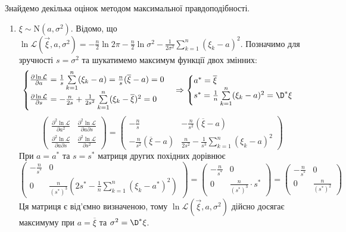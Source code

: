\begin{example}
    Знайдемо декілька оцінок методом максимальної правдоподібності.
    \begin{enumerate}
        \item $\xi \sim \mathrm{N}(a, \sigma^2)$. Відомо, що $\ln \mathcal{L}(\vec{\xi}, a, \sigma^2) = -\frac{n}{2}\ln{2\pi} - \frac{n}{2} \ln{\sigma^2} - \frac{1}{2\sigma^2}\sum\limits_{k=1}^n (\xi_k - a)^2$. 
        Позначимо для зручності $s = \sigma^2$ та шукатимемо максимум функції двох змінних:
        $$\begin{cases}
            \frac{\partial \ln \mathcal{L}}{\partial a} = \frac{1}{s} \sum\limits_{k=1}^n (\xi_k - a) = \frac{n}{s}(\overline{\xi} - a) = 0 \\
            \frac{\partial \ln \mathcal{L}}{\partial s} = -\frac{n}{2s} + \frac{1}{2s^2} \sum\limits_{k=1}^n (\xi_k - \overline{\xi})^2 = 0
        \end{cases} \Rightarrow
        \begin{cases}
            a^* = \overline{\xi} \\
            s^* =  \frac{1}{n} \sum\limits_{k=1}^n (\xi_k - a)^2 = \D^* \xi
        \end{cases}$$
        $$\begin{pmatrix}
            \frac{\partial^2 \ln \mathcal{L}}{\partial a^2} & \frac{\partial^2 \ln \mathcal{L}}{\partial a \partial s} \\
            \frac{\partial^2 \ln \mathcal{L}}{\partial a \partial s} & \frac{\partial^2 \ln \mathcal{L}}{\partial s^2}
        \end{pmatrix} = 
        \begin{pmatrix}
            -\frac{n}{s} & -\frac{n}{s^2}(\overline{\xi} - a) \\
            -\frac{n}{s^2}(\overline{\xi} - a) & \frac{n}{2s^2} - \frac{1}{s^3}\sum\limits_{k=1}^n (\xi_k - a)^2
        \end{pmatrix}$$
        При $a = a^*$ та $s = s^*$ матриця других похідних дорівнює 
        $$\begin{pmatrix}
            -\frac{n}{s^*} & 0 \\
            0 & \frac{n}{(s^*)^3} \left( 2s^* - \frac{1}{n}\sum\limits_{k=1}^n (\xi_k - a^*)^2\right)
        \end{pmatrix} =
        \begin{pmatrix}
            -\frac{n}{s^*}  & 0 \\
            0 & \frac{n}{(s^*)^3}\cdot s^*
        \end{pmatrix} = 
        \begin{pmatrix}
            -\frac{n}{s^*}  & 0 \\
            0 & \frac{n}{(s^*)^2}
        \end{pmatrix}$$
        Ця матриця є від'ємно визначеною, тому $\ln \mathcal{L}(\vec{\xi}, a, \sigma^2)$ дійсно досягає максимуму при
        $a = \overline{\xi}$ та $\sigma^2 = \D^* \xi$.
    \end{enumerate}
\end{example}